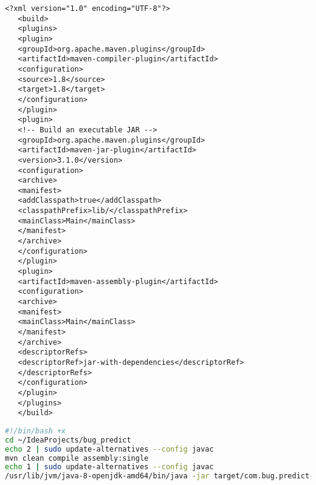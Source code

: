 \begin{latin}
	\begin{lstlisting}[language=x]
   <?xml version="1.0" encoding="UTF-8"?>
   <build>
   <plugins>
   <plugin>
   <groupId>org.apache.maven.plugins</groupId>
   <artifactId>maven-compiler-plugin</artifactId>
   <configuration>
   <source>1.8</source>
   <target>1.8</target>
   </configuration>
   </plugin>
   <plugin>
   <!-- Build an executable JAR -->
   <groupId>org.apache.maven.plugins</groupId>
   <artifactId>maven-jar-plugin</artifactId>
   <version>3.1.0</version>
   <configuration>
   <archive>
   <manifest>
   <addClasspath>true</addClasspath>
   <classpathPrefix>lib/</classpathPrefix>
   <mainClass>Main</mainClass>
   </manifest>
   </archive>
   </configuration>
   </plugin>
   <plugin>
   <artifactId>maven-assembly-plugin</artifactId>
   <configuration>
   <archive>
   <manifest>
   <mainClass>Main</mainClass>
   </manifest>
   </archive>
   <descriptorRefs>
   <descriptorRef>jar-with-dependencies</descriptorRef>
   </descriptorRefs>
   </configuration>
   </plugin>
   </plugins>
   </build>
\end{lstlisting}
\end{latin}
\label{code:pom}

\lstset{style=appstyle}
\begin{latin}
\begin{lstlisting}[language=bash]
#!/bin/bash +x
cd ~/IdeaProjects/bug_predict
echo 2 | sudo update-alternatives --config javac
mvn clean compile assembly:single
echo 1 | sudo update-alternatives --config javac
/usr/lib/jvm/java-8-openjdk-amd64/bin/java -jar target/com.bug.predict-1.0-SNAPSHOT-jar-with-dependencies.jar
\end{lstlisting}
\end{latin}
\label{code:run}

